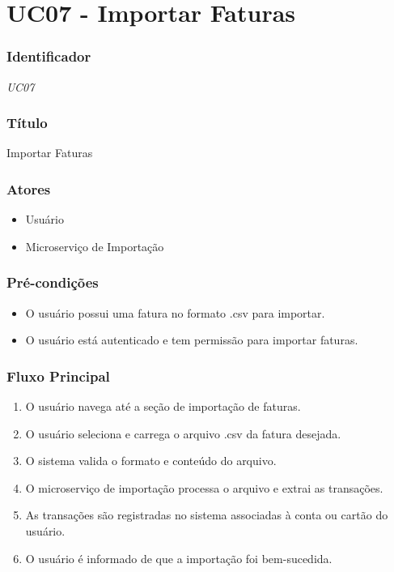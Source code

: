 \chapter{UC07 - Importar Faturas}
\label{apendiceUC07}

\subsection*{Identificador}
\textit{UC07}

\subsection*{Título}
Importar Faturas

\subsection*{Atores}
\begin{addmargin}[1.5cm]{0cm}
    \begin{itemize}
        \item Usuário
        \item Microserviço de Importação
    \end{itemize}
\end{addmargin}

\subsection*{Pré-condições}
\begin{addmargin}[1.5cm]{0cm}
    \begin{itemize}
        \item O usuário possui uma fatura no formato .csv para importar.
        \item O usuário está autenticado e tem permissão para importar faturas.
    \end{itemize}
\end{addmargin}

\subsection*{Fluxo Principal}
\begin{addmargin}[1.5cm]{0cm}
    \begin{enumerate}
        \item O usuário navega até a seção de importação de faturas.
        \item O usuário seleciona e carrega o arquivo .csv da fatura desejada.
        \item O sistema valida o formato e conteúdo do arquivo.
        \item O microserviço de importação processa o arquivo e extrai as transações.
        \item As transações são registradas no sistema associadas à conta ou cartão do usuário.
        \item O usuário é informado de que a importação foi bem-sucedida.
    \end{enumerate}
\end{addmargin}

